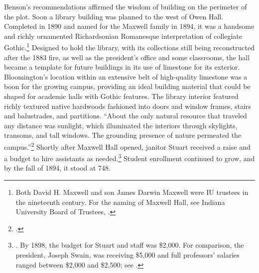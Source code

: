 \documentclass[
  american,
  letterpaper,
]{scrreprt}
\begin{document}
Benson's recommendations affirmed the wisdom of building on the
perimeter of the plot. Soon a library building was planned to the west
of Owen Hall. Completed in 1890 and named for the Maxwell family in
1894, it was a handsome and richly ornamented Richardsonian Romanesque
interpretation of collegiate Gothic.\footnote{Both David H. Maxwell and
  son James Darwin Maxwell were IU trustees in the nineteenth century.
  For the naming of Maxwell Hall, see Indiana University Board of
  Trustees, .}
Designed to hold the library, with its collections still being
reconstructed after the 1883 fire, as well as the president's office and
some classrooms, the hall became a template for future buildings in its
use of limestone for its exterior. Bloomington's location within an
extensive belt of high-quality limestone was a boon for the growing
campus, providing an ideal building material that could be shaped for
academic halls with Gothic features. The library interior featured
richly textured native hardwoods fashioned into doors and window frames,
stairs and balustrades, and partitions. ``About the only natural
resource that traveled any distance was sunlight, which illuminated the
interiors through skylights, transoms, and tall windows. The grounding
presence of nature permeated the campus.''\footnote{.} Shortly after Maxwell Hall opened,
janitor Stuart received a raise and a budget to hire assistants as
needed.\footnote{.
  By 1898, the budget for Stuart and staff was \$2,000. For comparison,
  the president, Joseph Swain, was receiving \$5,000 and full
  professors' salaries ranged between \$2,000 and \$2,500; see
  .}
Student enrollment continued to grow, and by the fall of 1894, it stood
at 748.
\end{document}
